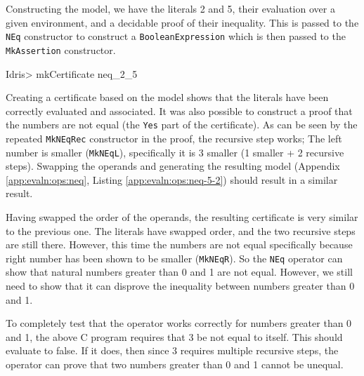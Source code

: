         
        Constructing the model, we have the literals 2 and 5, their evaluation over a given environment, and a decidable proof of their inequality. This is passed to the \texttt{NEq} constructor to construct a \texttt{BooleanExpression} which is then passed to the \texttt{MkAssertion} constructor.
        
        \begin{code}
Idris> mkCertificate neq_2_5
        \end{code}
        
        Creating a certificate based on the model shows that the literals have been correctly evaluated and associated. It was also possible to construct a proof that the numbers are not equal (the \texttt{Yes} part of the certificate). As can be seen by the repeated \texttt{MkNEqRec} constructor in the proof, the recursive step works; The left number is smaller (\texttt{MkNEqL}), specifically it is 3 smaller (1 smaller + 2 recursive steps). Swapping the operands and generating the resulting model (Appendix \ref{app:evaln:ops:neq}, Listing \ref{app:evaln:ops:neq-5-2}) should result in a similar result.
        
        
        Having swapped the order of the operands, the resulting certificate is very similar to the previous one. The literals have swapped order, and the two recursive steps are still there. However, this time the numbers are not equal specifically because right number has been shown to be smaller (\texttt{MkNEqR}). So the \texttt{NEq} operator can show that natural numbers greater than 0 and 1 are not equal. However, we still need to show that it can disprove the inequality between numbers greater than 0 and 1.
        
        
        
        To completely test that the operator works correctly for numbers greater than 0 and 1, the above C program requires that 3 be not equal to itself. This should evaluate to false. If it does, then since 3 requires multiple recursive steps, the operator can prove that two numbers greater than 0 and 1 cannot be unequal.
        
        \newpage
        
